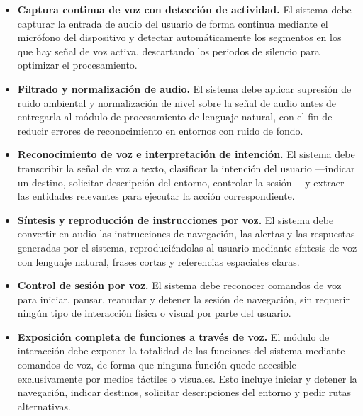 \begin{itemize}

    \item[\textbf{RF-01}] \textbf{Captura continua de voz con detección de actividad.}
    El sistema debe capturar la entrada de audio del usuario de forma continua mediante el
    micrófono del dispositivo y detectar automáticamente los segmentos en los que hay señal
    de voz activa, descartando los periodos de silencio para optimizar el procesamiento.

    \item[\textbf{RF-02}] \textbf{Filtrado y normalización de audio.}
    El sistema debe aplicar supresión de ruido ambiental y normalización de nivel sobre la
    señal de audio antes de entregarla al módulo de procesamiento de lenguaje natural, con
    el fin de reducir errores de reconocimiento en entornos con ruido de fondo.

    \item[\textbf{RF-03}] \textbf{Reconocimiento de voz e interpretación de intención.}
    El sistema debe transcribir la señal de voz a texto, clasificar la intención del usuario
    ---indicar un destino, solicitar descripción del entorno, controlar la sesión--- y
    extraer las entidades relevantes para ejecutar la acción correspondiente.

    \item[\textbf{RF-04}] \textbf{Síntesis y reproducción de instrucciones por voz.}
    El sistema debe convertir en audio las instrucciones de navegación, las alertas y las
    respuestas generadas por el sistema, reproduciéndolas al usuario mediante síntesis de
    voz con lenguaje natural, frases cortas y referencias espaciales claras.

    \item[\textbf{RF-05}] \textbf{Control de sesión por voz.}
    El sistema debe reconocer comandos de voz para iniciar, pausar, reanudar y detener la
    sesión de navegación, sin requerir ningún tipo de interacción física o visual por parte
    del usuario.

    \item[\textbf{RF-06}] \textbf{Exposición completa de funciones a través de voz.}
    El módulo de interacción debe exponer la totalidad de las funciones del sistema mediante
    comandos de voz, de forma que ninguna función quede accesible exclusivamente por medios
    táctiles o visuales. Esto incluye iniciar y detener la navegación, indicar destinos,
    solicitar descripciones del entorno y pedir rutas alternativas.

\end{itemize}

